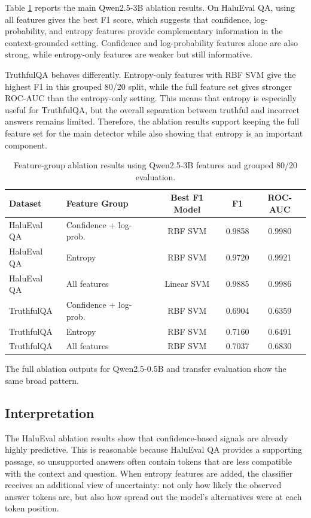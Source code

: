 \documentclass[11pt]{article}
\begin{document}
Table \ref{tab:ablation-results} reports the main Qwen2.5-3B ablation results. On HaluEval QA, using all features gives the best F1 score, which suggests that confidence, log-probability, and entropy features provide complementary information in the context-grounded setting. Confidence and log-probability features alone are also strong, while entropy-only features are weaker but still informative.

TruthfulQA behaves differently. Entropy-only features with RBF SVM give the highest F1 in this grouped 80/20 split, while the full feature set gives stronger ROC-AUC than the entropy-only setting. This means that entropy is especially useful for TruthfulQA, but the overall separation between truthful and incorrect answers remains limited. Therefore, the ablation results support keeping the full feature set for the main detector while also showing that entropy is an important component.

\begin{table}[H]
    \centering
    \small
    \begin{tabular}{llccc}
        \toprule
        Dataset & Feature Group & Best F1 Model & F1 & ROC-AUC \\
        \midrule
        HaluEval QA & Confidence + log-prob. & RBF SVM & 0.9858 & 0.9980 \\
        HaluEval QA & Entropy & RBF SVM & 0.9720 & 0.9921 \\
        HaluEval QA & All features & Linear SVM & 0.9885 & 0.9986 \\
        \midrule
        TruthfulQA & Confidence + log-prob. & RBF SVM & 0.6904 & 0.6359 \\
        TruthfulQA & Entropy & RBF SVM & 0.7160 & 0.6491 \\
        TruthfulQA & All features & RBF SVM & 0.7037 & 0.6830 \\
        \bottomrule
    \end{tabular}
    \caption{Feature-group ablation results using Qwen2.5-3B features and grouped 80/20 evaluation.}
    \label{tab:ablation-results}
\end{table}

The full ablation outputs for Qwen2.5-0.5B and transfer evaluation show the same broad pattern.

\subsection{Interpretation}
The HaluEval ablation results show that confidence-based signals are already highly predictive. This is reasonable because HaluEval QA provides a supporting passage, so unsupported answers often contain tokens that are less compatible with the context and question. When entropy features are added, the classifier receives an additional view of uncertainty: not only how likely the observed answer tokens are, but also how spread out the model's alternatives were at each token position.
\end{document}

